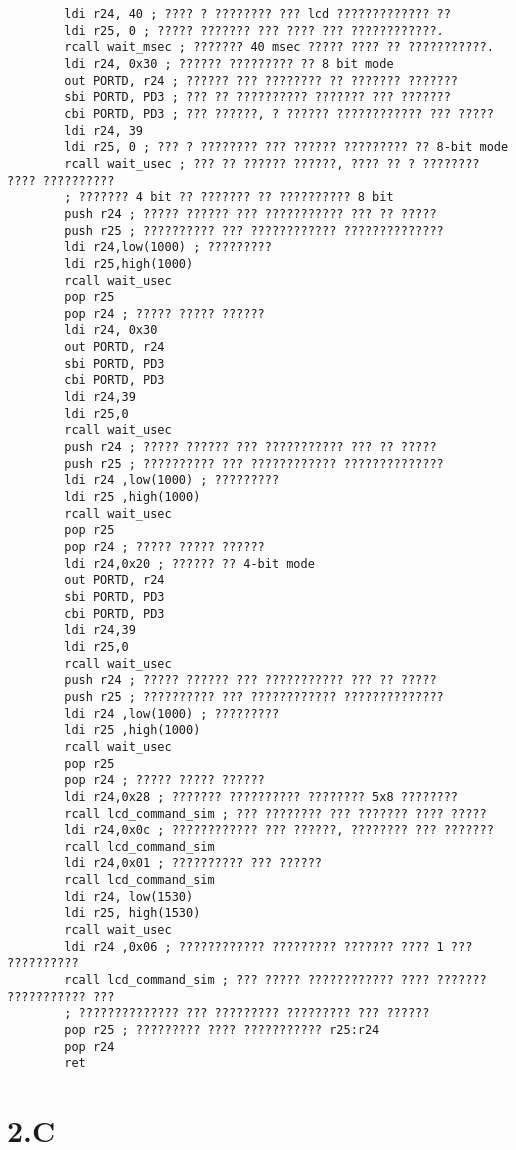 \documentclass{article}
\begin{document}
\begin{verbatim}
        ldi r24, 40 ; ???? ? ???????? ??? lcd ????????????? ??
        ldi r25, 0 ; ????? ??????? ??? ???? ??? ????????????.
        rcall wait_msec ; ??????? 40 msec ????? ???? ?? ???????????.
        ldi r24, 0x30 ; ?????? ????????? ?? 8 bit mode
        out PORTD, r24 ; ?????? ??? ???????? ?? ??????? ???????
        sbi PORTD, PD3 ; ??? ?? ?????????? ??????? ??? ???????
        cbi PORTD, PD3 ; ??? ??????, ? ?????? ???????????? ??? ?????
        ldi r24, 39
        ldi r25, 0 ; ??? ? ???????? ??? ?????? ????????? ?? 8-bit mode
        rcall wait_usec ; ??? ?? ?????? ??????, ???? ?? ? ???????? ???? ??????????
        ; ??????? 4 bit ?? ??????? ?? ?????????? 8 bit
        push r24 ; ????? ?????? ??? ??????????? ??? ?? ?????
        push r25 ; ?????????? ??? ???????????? ??????????????
        ldi r24,low(1000) ; ?????????
        ldi r25,high(1000)
        rcall wait_usec
        pop r25
        pop r24 ; ????? ????? ??????
        ldi r24, 0x30
        out PORTD, r24
        sbi PORTD, PD3
        cbi PORTD, PD3
        ldi r24,39
        ldi r25,0
        rcall wait_usec 
        push r24 ; ????? ?????? ??? ??????????? ??? ?? ?????
        push r25 ; ?????????? ??? ???????????? ??????????????
        ldi r24 ,low(1000) ; ?????????
        ldi r25 ,high(1000)
        rcall wait_usec
        pop r25
        pop r24 ; ????? ????? ??????
        ldi r24,0x20 ; ?????? ?? 4-bit mode
        out PORTD, r24
        sbi PORTD, PD3
        cbi PORTD, PD3
        ldi r24,39
        ldi r25,0
        rcall wait_usec
        push r24 ; ????? ?????? ??? ??????????? ??? ?? ?????
        push r25 ; ?????????? ??? ???????????? ??????????????
        ldi r24 ,low(1000) ; ?????????
        ldi r25 ,high(1000)
        rcall wait_usec
        pop r25
        pop r24 ; ????? ????? ??????
        ldi r24,0x28 ; ??????? ?????????? ???????? 5x8 ????????
        rcall lcd_command_sim ; ??? ???????? ??? ??????? ???? ?????
        ldi r24,0x0c ; ???????????? ??? ??????, ???????? ??? ???????
        rcall lcd_command_sim
        ldi r24,0x01 ; ?????????? ??? ??????
        rcall lcd_command_sim
        ldi r24, low(1530)
        ldi r25, high(1530)
        rcall wait_usec
        ldi r24 ,0x06 ; ???????????? ????????? ??????? ???? 1 ??? ??????????
        rcall lcd_command_sim ; ??? ????? ???????????? ???? ??????? ??????????? ???
        ; ?????????????? ??? ????????? ????????? ??? ??????
        pop r25 ; ????????? ???? ??????????? r25:r24
        pop r24
		ret
\end{verbatim}


\section*{2.C}
\end{document}
